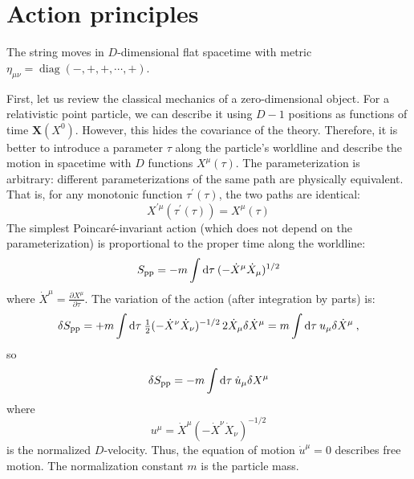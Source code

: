 \section{\texorpdfstring{Action principles}{Action principles}} \label{sec:1.2}
The string moves in $D$-dimensional flat spacetime with metric $\eta_{\mu\nu}=\operatorname{diag}(-,+,+,\cdots,+)$. 

First, let us review the classical mechanics of a zero-dimensional object. 
For a relativistic point particle, we can describe it using $D-1$ positions as functions of time $\textbf{X}(X^0)$. However, this hides the covariance of the theory. 
Therefore, it is better to introduce a parameter $\tau$ along the particle's worldline and describe the motion in spacetime with $D$ functions $X^\mu(\tau)$. The parameterization is arbitrary: different parameterizations of the same path are physically equivalent. That is, for any monotonic function $\tau^\prime(\tau)$, the two paths are identical: 
\begin{equation}
	X^{\prime\mu}(\tau^\prime(\tau))=X^\mu(\tau)
\end{equation}
The simplest Poincaré-invariant action (which does not depend on the parameterization) is proportional to the proper time along the worldline: 
\begin{equation}
	S_{\mathrm{pp}}=-m \int \mathrm{d}\tau\:(-\dot{X}^\mu \dot{X}_\mu)^{1/2}
\end{equation}
where $\dot{X}^\mu=\frac{\partial X^\mu}{\partial \tau}$. 
The variation of the action (after integration by parts) is: 
\begin{equation}
	\delta S_{\mathrm{pp}}=+m \int \mathrm{d}\tau\: \tfrac{1}{2}(-\dot{X}^\nu \dot{X}_\nu)^{-1/2}\, 2\dot{X}_\mu \delta\dot{X}^\mu=m \int \mathrm{d}\tau\: u_\mu \delta \dot{X}^\mu \nonumber\:,
\end{equation}
so 
\begin{equation}
	\delta S_{\mathrm{pp}}=-m \int \mathrm{d}\tau\: \dot{u}_\mu \delta X^\mu
\end{equation}
where 
\begin{equation}
	u^\mu=\dot{X}^\mu (-\dot{X}^\nu \dot{X}_\nu)^{-1/2}
\end{equation}
is the normalized $D$-velocity. 
Thus, the equation of motion $\dot{u}^\mu=0$ describes free motion. The normalization constant $m$ is the particle mass. 

